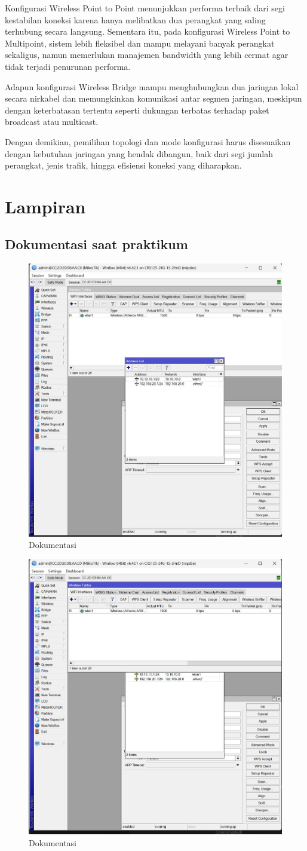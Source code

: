 Konfigurasi Wireless Point to Point menunjukkan performa terbaik dari segi kestabilan koneksi karena hanya melibatkan dua perangkat yang saling terhubung secara langsung. Sementara itu, pada konfigurasi Wireless Point to Multipoint, sistem lebih fleksibel dan mampu melayani banyak perangkat sekaligus, namun memerlukan manajemen bandwidth yang lebih cermat agar tidak terjadi penurunan performa.

Adapun konfigurasi Wireless Bridge mampu menghubungkan dua jaringan lokal secara nirkabel dan memungkinkan komunikasi antar segmen jaringan, meskipun dengan keterbatasan tertentu seperti dukungan terbatas terhadap paket broadcast atau multicast.

Dengan demikian, pemilihan topologi dan mode konfigurasi harus disesuaikan dengan kebutuhan jaringan yang hendak dibangun, baik dari segi jumlah perangkat, jenis trafik, hingga efisiensi koneksi yang diharapkan.


\section{Lampiran}
\subsection{Dokumentasi saat praktikum}
\begin{figure}[H]
        \centering
        \includegraphics[width=0.5\linewidth]{P1/img/23.jpeg}
        \caption{Dokumentasi}
        \label{fig:gambar1}
    \end{figure}

    \begin{figure}[H]
        \centering
        \includegraphics[width=0.5\linewidth]{P1/img/24.jpeg}
        \caption{Dokumentasi}
        \label{fig:gambar1}
    \end{figure}

